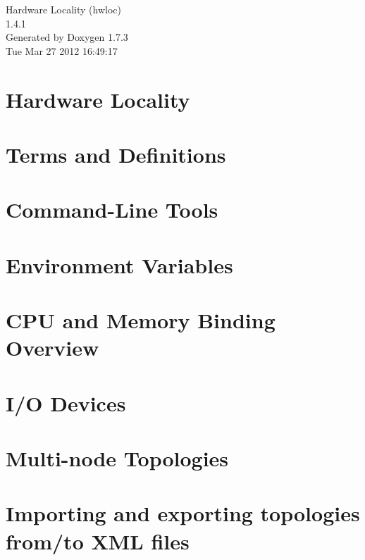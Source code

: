\documentclass[a4paper]{book}
\begin{document}
\hypersetup{pageanchor=false}
\begin{titlepage}
\vspace*{7cm}
\begin{center}
{\Large Hardware Locality (hwloc) \\[1ex]\large 1.4.1 }\\
\vspace*{1cm}
{\large Generated by Doxygen 1.7.3}\\
\vspace*{0.5cm}
{\small Tue Mar 27 2012 16:49:17}\\
\end{center}
\end{titlepage}
\clearemptydoublepage
{}
\tableofcontents
\clearemptydoublepage
{}
\hypersetup{pageanchor=true}
\chapter{Hardware Locality}
\label{index}\hypertarget{index}{}
\chapter{Terms and Definitions}
\label{termsanddefs}
\hypertarget{termsanddefs}{}

\chapter{Command-\/Line Tools}
\label{tools}
\hypertarget{tools}{}

\chapter{Environment Variables}
\label{envvar}
\hypertarget{envvar}{}

\chapter{CPU and Memory Binding Overview}
\label{cpu_mem_bind}
\hypertarget{cpu_mem_bind}{}

\chapter{I/O Devices}
\label{iodevices}
\hypertarget{iodevices}{}

\chapter{Multi-\/node Topologies}
\label{multinode}
\hypertarget{multinode}{}

\chapter{Importing and exporting topologies from/to XML files}
\label{xml}
\hypertarget{xml}{}

\end{document}
